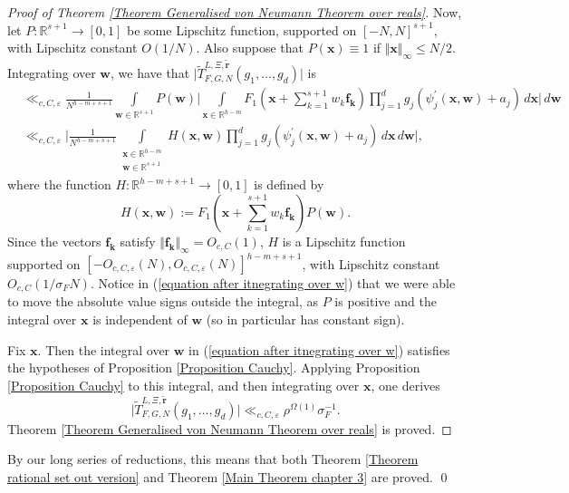 \documentclass[12pt,a4paper,twoside,reqno]{amsart}
\numberwithin{equation}{section}
\begin{document}
\begin{proof}[Proof of Theorem \ref{Theorem Generalised von Neumann Theorem over reals}]
Now, let $P:\mathbb{R}^{s+1}\longrightarrow [0,1]$ be some Lipschitz function, supported on $[-N,N]^{s+1}$, with Lipschitz constant $O(1/N)$. Also suppose that $ P(\mathbf{x}) \equiv 1$ if $\Vert \mathbf{x}\Vert_\infty \leqslant N/2$. Integrating over $\mathbf{w}$, we have that $\vert\widetilde{T}_{F,G,N}^{L,\Xi,\widetilde{\mathbf{r}}}(g_1,\dots,g_d)\vert$ is
\begin{align}
 &\ll_{c,C,\varepsilon}
\frac{1}{N^{h-m+s+1}} \int\limits_{\mathbf{w} \in \mathbb{R}^{s+1}} P(\mathbf{w}) \Big\vert\int\limits_{\mathbf{x}\in\mathbb{R}^{h-m}} F_1(\mathbf{x} + \sum\limits_{k=1}^{s+1} w_k \mathbf{f_k})\prod\limits_{j=1}^{d} g_j(\psi_j^\prime(\mathbf{x},\mathbf{w}) + a_j) \, d\mathbf{x}\Big\vert \, d\mathbf{w} \nonumber \\
\label{equation after itnegrating over w}
 &\ll_{c,C,\varepsilon}\Big\vert\frac{1}{N^{h-m+s+1}} \int\limits_{\substack{\mathbf{x} \in \mathbb{R}^{h-m}\\ \mathbf{w} \in \mathbb{R}^{s+1}}} H(\mathbf{x},\mathbf{w}) \prod\limits_{j=1}^{d} g_j(\psi_j^\prime(\mathbf{x},\mathbf{w}) + a_j) \, d\mathbf{x} \, d\mathbf{w}\Big\vert,
\end{align}
where the function $H:\mathbb{R}^{h-m+s+1} \longrightarrow [0,1]$ is defined by \[H(\mathbf{x},\mathbf{w}):= F_1(\mathbf{x} + \sum\limits_{k=1}^{s+1} w_k \mathbf{f_k}) P(\mathbf{w}). \] Since the vectors $\mathbf{f_k}$ satisfy $\Vert \mathbf{f_k}\Vert_\infty = O_{c,C}(1)$, $H$ is a Lipschitz function supported on $[-O_{c,C,\varepsilon} (N),O_{c,C,\varepsilon}(N)]^{h-m+s+1}$, with Lipschitz constant $O_{c,C}(1/\sigma_F N).$ Notice in (\ref{equation after itnegrating over w}) that we were able to move the absolute value signs outside the integral, as $P$ is positive and the integral over $\mathbf{x}$ is independent of $\mathbf{w}$ (so in particular has constant sign).

Fix $\mathbf{x}$. Then the integral over $\mathbf{w}$ in (\ref{equation after itnegrating over w}) satisfies the hypotheses of Proposition \ref{Proposition Cauchy}. Applying Proposition \ref{Proposition Cauchy} to this integral, and then integrating over $\mathbf{x}$, one derives \[\vert \widetilde{T}_{F,G,N}^{L,\Xi,\widetilde{\mathbf{r}}}(g_1,\dots,g_d)\vert \ll_{c,C,\varepsilon} \rho^{\Omega(1)} \sigma_F^{-1}. \] Theorem \ref{Theorem Generalised von Neumann Theorem over reals} is proved. 
\end{proof}

By our long series of reductions, this means that both Theorem \ref{Theorem rational set out version} and Theorem \ref{Main Theorem chapter 3} are proved. \qed \\
\end{document}
